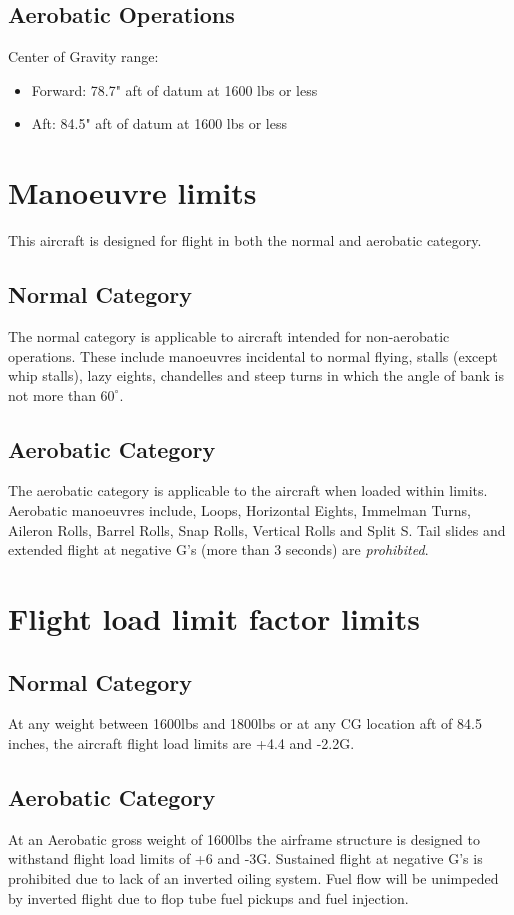 \subsection{Aerobatic Operations}
Center of Gravity range:
\begin{itemize}
\item{Forward:} 78.7" aft of datum at 1600 lbs or less
\item{Aft:} 84.5" aft of datum at 1600 lbs or less
\end{itemize}

\section{Manoeuvre limits}
This aircraft is designed for flight in both the normal and aerobatic category.
\subsection{Normal Category}
The normal category is applicable to aircraft intended for non-aerobatic operations.  These include manoeuvres incidental to normal flying, stalls (except whip stalls), lazy eights, chandelles and steep turns in which the angle of bank is not more than $60^{\circ}$.

\subsection{Aerobatic Category}
The aerobatic category is applicable to the aircraft when loaded within limits.  Aerobatic 
manoeuvres include, Loops, Horizontal Eights, Immelman Turns, Aileron Rolls, Barrel Rolls, 
Snap Rolls, Vertical Rolls and Split S. Tail slides and extended flight at negative G's 
(more than 3 seconds) are {\em prohibited}.

\section{Flight load limit factor limits}
\subsection{Normal Category}
At any weight between 1600lbs and 1800lbs or at any CG location aft of 84.5 inches, the aircraft 
flight load limits are +4.4 and -2.2G.

\subsection{Aerobatic Category}
At an Aerobatic gross weight of 1600lbs the airframe structure is designed to withstand 
flight load limits of +6 and -3G. Sustained flight at negative G's is prohibited due to lack
of an inverted oiling system. Fuel flow will be unimpeded by inverted flight due to flop tube
fuel pickups and fuel injection.  


